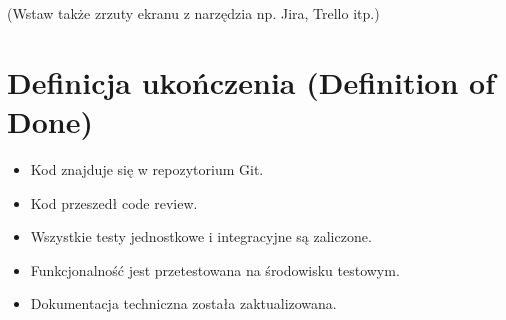 \documentclass[12pt,a4paper]{article}
\begin{document}
(Wstaw także zrzuty ekranu z narzędzia np. Jira, Trello itp.)

\section{Definicja ukończenia (Definition of Done)}
\begin{itemize}
    \item Kod znajduje się w repozytorium Git.
    \item Kod przeszedł code review.
    \item Wszystkie testy jednostkowe i integracyjne są zaliczone.
    \item Funkcjonalność jest przetestowana na środowisku testowym.
    \item Dokumentacja techniczna została zaktualizowana.
\end{itemize}
\end{document}
